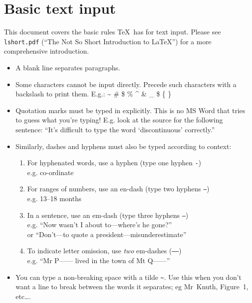 \documentclass[article]{memoir}
\begin{document}
\chapter*{Basic text input}

This document covers the basic rules \TeX\ has for text input. Please see \texttt{lshort.pdf} (``The Not So Short Introduction to LaTeX'') for a more comprehensive introduction.

\begin{itemize}

\item	A blank line separates paragraphs.

\item	Some characters cannot be input directly. Precede such characters with a backslash to print them. E.g.: 
\~{}
\#
\$
\%
\^{}
\&
\_
\$
\{
\}

\item	Quotation marks must be typed in explicitly. This is no MS Word that tries to guess what you're typing! E.g. look at the source for the following sentence: ``It's difficult to type the word `discontinuous' correctly.''

\item	Similarly, dashes and hyphens must also be typed according to context:
	\begin{enumerate}
	\tightlist
	\item	For hyphenated words, use a hyphen (type one hyphen \texttt{-})\\
	e.g. co-ordinate
	\item	For ranges of numbers, use an en-dash (type two hyphens \texttt{--})\\
	e.g. 13--18 months
	\item	In a sentence, use an em-dash (type three hyphens \texttt{---})\\
	e.g. ``Now wasn't I about to---where's he gone?''\\
	or ``Don't---to quote a president---misunderestimate''
	\item	To indicate letter omission, use \emph{two} em-dashes (\texttt{------})\\
	e.g. ``Mr P------ lived in the town of Mt Q------''
	\end{enumerate}
	
\item	You can type a non-breaking space with a tilde \texttt{\~}. Use this when you don't want a line to break between the words it separates; eg Mr~Knuth, Figure~1, etc\dots.


\end{itemize}
\end{document}
